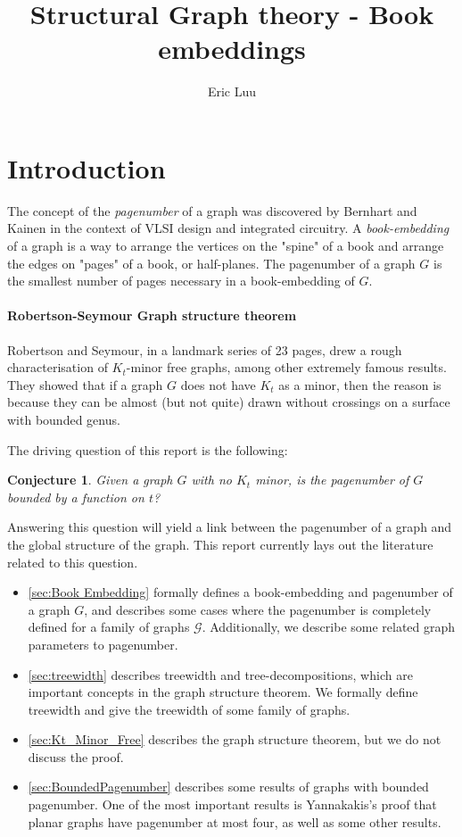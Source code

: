 \documentclass[]{article}
\title{Structural Graph theory - Book embeddings}
\author{Eric Luu}
\newtheorem{conjecture}[theorem]{Conjecture}
\theoremstyle{definition}
\numberwithin{theorem}{section}
\numberwithin{equation}{section}
\begin{document}
\maketitle
\section{Introduction}\label{sec:introduction}
The concept of the \textit{pagenumber} of a graph was discovered by Bernhart and Kainen\cite{bernhartBookThicknessGraph1979} in the context of VLSI design and integrated circuitry. A \textit{book-embedding} of a graph is a way to arrange the vertices on the "spine" of a book and arrange the edges on "pages" of a book, or half-planes. The pagenumber of a graph $G$ is the smallest number of pages necessary in a book-embedding of $G$. 
\paragraph{Robertson-Seymour Graph structure theorem}
Robertson and Seymour, in a landmark series of 23 pages, drew a rough characterisation of $K_t$-minor free graphs, among other extremely famous results. They showed that if a graph $G$ does not have $K_t$ as a minor, then the reason is because they can be almost (but not quite) drawn without crossings on a surface with bounded genus. 

The driving question of this report is the following: 
\begin{conjecture}\label{conj:bded_had_pn}
	Given a graph $G$ with no $K_t$ minor, is the pagenumber of $G$ bounded by a function on $t$?
\end{conjecture}
Answering this question will yield a link between the pagenumber of a graph and the global structure of the graph. This report currently lays out the literature related to this question.
\begin{itemize}
	\item \cref{sec:Book Embedding} formally defines a book-embedding and pagenumber of a graph $G$, and describes some cases where the pagenumber is completely defined for a family of graphs $\mathcal{G}$. Additionally, we describe some related graph parameters to pagenumber.
	\item \cref{sec:treewidth} describes treewidth and tree-decompositions, which are important concepts in the graph structure theorem. We formally define treewidth and give the treewidth of some family of graphs. 
	\item \cref{sec:Kt_Minor_Free} describes the graph structure theorem, but we do not discuss the proof.
	\item \cref{sec:BoundedPagenumber} describes some results of graphs with bounded pagenumber. One of the most important results is Yannakakis's proof that planar graphs have pagenumber at most four\cite{yannakakisEmbeddingPlanarGraphs1989}, as well as some other results. 
\end{itemize}
\end{document}
